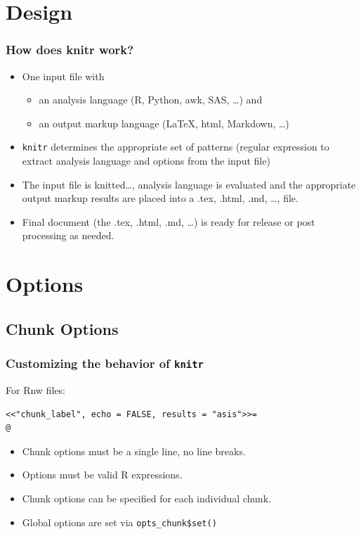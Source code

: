 \documentclass[t]{beamer}\usepackage[]{graphicx}\usepackage[]{color}
\begin{document}
\section{Design}
\begin{frame}[fragile]
  \frametitle{How does knitr work?}
  \begin{itemize}
    \item One input file with 
      \begin{itemize}
        \item an analysis language (R, Python, awk, SAS, \ldots) and 
        \item an output markup language (\LaTeX, html, Markdown, \ldots)
      \end{itemize}

    \item {\tt knitr} determines the appropriate set of patterns (regular
      expression to extract analysis language and options from the input file)

    \item The input file is knitted\ldots, analysis language is evaluated and
      the appropriate output markup results are placed into a .tex, .html, .md,
      \ldots, file.

    \item Final document (the .tex, .html, .md, \ldots)  is ready for release or
      post processing as needed.

  \end{itemize}
\end{frame} 


\section{Options}
\subsection{Chunk Options}
\begin{frame}[fragile]
  \frametitle{Customizing the behavior of {\tt knitr}}
  For Rnw files:

  \begin{verbatim}<<"chunk_label", echo = FALSE, results = "asis">>=
@
  \end{verbatim}
  \begin{itemize}
    \item Chunk options must be a single line, no line breaks.  
    \item Options must be valid R expressions.
    \item Chunk options can be specified for each individual chunk.
    \item Global options are set via \verb;opts_chunk$set();
  \end{itemize}
\end{frame}
\end{document}
